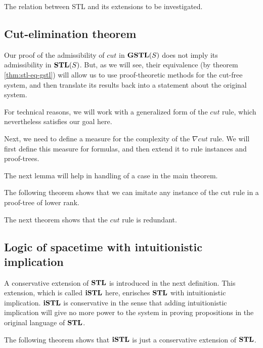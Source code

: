 \documentclass[12pt,a4paper]{article}
\begin{document}

{\color{red} The relation between STL and its extensions to be investigated.}

\subsection{Cut-elimination theorem}
Our proof of the admissibility of $cut$ in $\mathbf{GSTL}(S)$ does not imply its admissibility in $\mathbf{STL}(S)$. But, as we will see, their equivalence (by theorem \ref{thm:stl-eq-gstl}) will allow us to use proof-theoretic methods for the cut-free system, and then translate its results back into a statement about the original system.

For technical reasons, we will work with a generalized form of the $cut$ rule, which nevertheless satisfies our goal here.





Next, we need to define a measure for the complexity of the $\nabla cut$ rule. We will first define this measure for formulas, and then extend it to rule instances and proof-trees.



The next lemma will help in handling of a case in the main theorem.



The following theorem shows that we can imitate any instance of the cut rule in a proof-tree of lower rank.



The next theorem shows that the $cut$ rule is redundant.



\subsection{Logic of spacetime with intuitionistic implication}
A conservative extension of $\mathbf{STL}$ is introduced in the next definition. This extension, which is called $\mathbf{iSTL}$ here, enrisches $\mathbf{STL}$ with intuitionistic implication. $\mathbf{iSTL}$ is conservative in the sense that adding intuitionistic implication will give no more power to the system in proving propositions in the original language of $\mathbf{STL}$.



The following theorem shows that $\mathbf{iSTL}$ is just a conservative extension of $\mathbf{STL}$.
\end{document}
